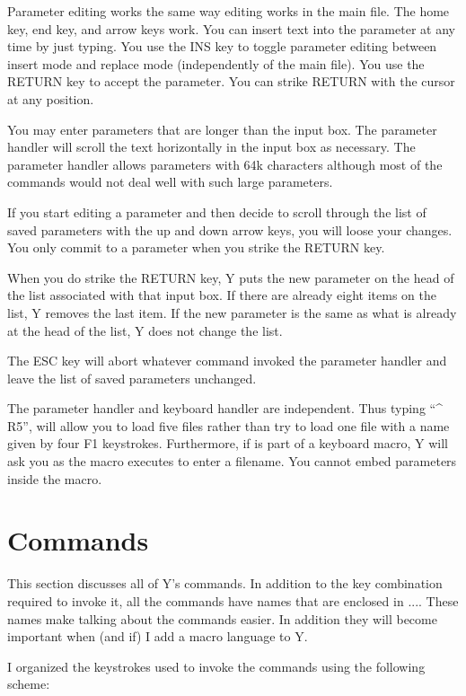 Parameter editing works the same way editing works in the main file. The home key, end key, and
arrow keys work. You can insert text into the parameter at any time by just typing. You use the
INS key to toggle parameter editing between insert mode and replace mode (independently of the
main file). You use the RETURN key to accept the parameter. You can strike RETURN with the
cursor at any position.

You may enter parameters that are longer than the input box. The parameter handler will scroll
the text horizontally in the input box as necessary. The parameter handler allows parameters
with 64k characters although most of the commands would not deal well with such large
parameters.

If you start editing a parameter and then decide to scroll through the list of saved parameters
with the up and down arrow keys, you will loose your changes. You only commit to a parameter
when you strike the RETURN key.

When you do strike the RETURN key, Y puts the new parameter on the head of the list associated
with that input box. If there are already eight items on the list, Y removes the last item. If
the new parameter is the same as what is already at the head of the list, Y does not change the
list. 

The ESC key will abort whatever command invoked the parameter handler and leave the list of
saved parameters unchanged.

The parameter handler and keyboard handler are independent. Thus typing ``\textasciicircum
R5'', will allow you to load five files rather than try to load one file with a name
given by four F1 keystrokes. Furthermore, if  is part of a keyboard macro, Y will ask
you as the macro executes to enter a filename. You cannot embed parameters inside the macro.

\section{Commands}

This section discusses all of Y's commands. In addition to the key combination required to
invoke it, all the commands have names that are enclosed in {...}. These names make talking
about the commands easier. In addition they will become important when (and if) I add a macro
language to Y.

I organized the keystrokes used to invoke the commands using the following scheme:

